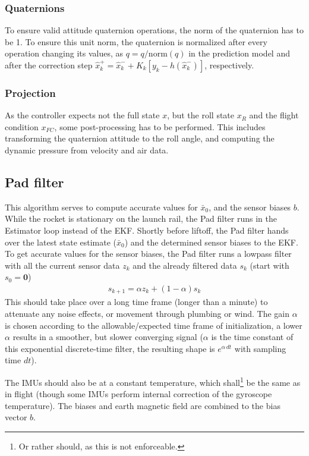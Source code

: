 \subsubsection{Quaternions}
To ensure valid attitude quaternion operations, the norm of the quaternion has to be 1.
To ensure this unit norm, the quaternion is normalized after every operation changing its values, as $q = q/\mathrm{norm}(q)$ in the prediction model and after the correction step $\hat x_{k}^{+} = \hat x_{k}^{-} + K_{k} \left[ y_{k} - h(\hat x_{k}^{-}) \right]$, respectively.

\subsubsection{Projection}
As the controller expects not the full state $x$, but the roll state $x_R$ and the flight condition $x_{FC}$, some post-processing has to be performed.
This includes transforming the quaternion attitude to the roll angle, and computing the dynamic pressure from velocity and air data.

\subsection{Pad filter}
\label{sec:estimator-initialization}
This algorithm serves to compute accurate values for $\bar x_0$, and the sensor biases $b$.
While the rocket is stationary on the launch rail, the Pad filter runs in the Estimator loop instead of the EKF.
Shortly before liftoff, the Pad filter hands over the latest state estimate ($\bar x_0$) and the determined sensor biases to the EKF.
To get accurate values for the sensor biases, the Pad filter runs a lowpass filter with all the current sensor data $z_k$ and the already filtered data $s_k$ (start with $s_0 = \bm 0$)
\begin{align}
    s_{k+1} = \alpha z_k + (1-  \alpha) s_k
\end{align}
This should take place over a long time frame (longer than a minute) to attenuate any noise effects, or movement through plumbing or wind.
The gain $\alpha$ is chosen according to the allowable/expected time frame of initialization, a lower $\alpha$ results in a smoother, but slower converging signal ($\alpha$ is the time constant of this exponential discrete-time filter, the resulting shape is $e^{\alpha \, dt}$ with sampling time $dt$).

The IMUs should also be at a constant temperature, which shall\footnote{Or rather should, as this is not enforceable.} be the same as in flight (though some IMUs perform internal correction of the gyroscope temperature).
The biases and earth magnetic field are combined to the bias vector $b$.

